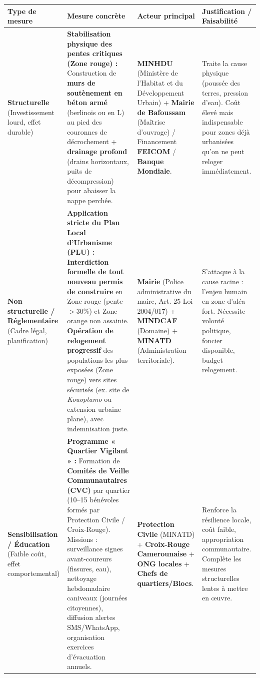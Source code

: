 \documentclass[11pt]{article}
\begin{document}
\begin{exoresolu}
\begin{center}
\begin{tabularx}{\linewidth}{|l|X|X|X|}\hline
\rowcolor{popblueL}
\textbf{Type de mesure} & \textbf{Mesure concrète} & \textbf{Acteur principal} & \textbf{Justification / Faisabilité} \\ \hline
\textbf{Structurelle} (Investissement lourd, effet durable) & \textbf{Stabilisation physique des pentes critiques (Zone rouge) :} Construction de \textbf{murs de soutènement en béton armé} (berlinois ou en L) au pied des couronnes de décrochement + \textbf{drainage profond} (drains horizontaux, puits de décompression) pour abaisser la nappe perchée. & \textbf{MINHDU} (Ministère de l'Habitat et du Développement Urbain) + \textbf{Mairie de Bafoussam} (Maîtrise d'ouvrage) / Financement \textbf{FEICOM} / \textbf{Banque Mondiale}. & Traite la cause physique (poussée des terres, pression d'eau). Coût élevé mais indispensable pour zones déjà urbanisées qu'on ne peut reloger immédiatement. \\ \hline
\textbf{Non structurelle / Réglementaire} (Cadre légal, planification) & \textbf{Application stricte du Plan Local d'Urbanisme (PLU) :} \textbf{Interdiction formelle de tout nouveau permis de construire} en Zone rouge (pente $>30\%$) et Zone orange non assainie. \textbf{Opération de relogement progressif} des populations les plus exposées (Zone rouge) vers sites sécurisés (ex. site de \emph{Kouoptamo} ou extension urbaine plane), avec indemnisation juste. & \textbf{Mairie} (Police administrative du maire, Art. 25 Loi 2004/017) + \textbf{MINDCAF} (Domaine) + \textbf{MINATD} (Administration territoriale). & S'attaque à la cause racine : l'enjeu humain en zone d'aléa fort. Nécessite volonté politique, foncier disponible, budget relogement. \\ \hline
\textbf{Sensibilisation / Éducation} (Faible coût, effet comportemental) & \textbf{Programme « Quartier Vigilant » :} Formation de \textbf{Comités de Veille Communautaires (CVC)} par quartier (10--15 bénévoles formés par Protection Civile / Croix-Rouge). Missions : surveillance signes avant-coureurs (fissures, eau), nettoyage hebdomadaire caniveaux (journées citoyennes), diffusion alertes SMS/WhatsApp, organisation exercices d'évacuation annuels. & \textbf{Protection Civile} (MINATD) + \textbf{Croix-Rouge Camerounaise} + \textbf{ONG locales} + \textbf{Chefs de quartiers/Blocs}. & Renforce la résilience locale, coût faible, appropriation communautaire. Complète les mesures structurelles lentes à mettre en œuvre. \\ \hline
\end{tabularx}
\end{center}


\end{exoresolu}
\end{document}

